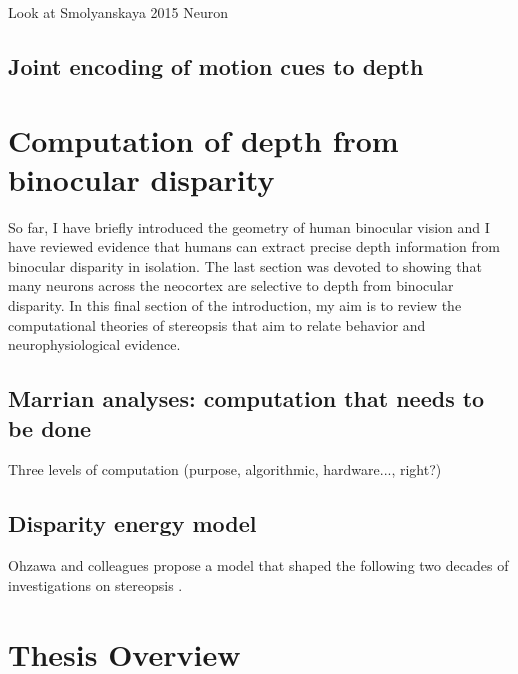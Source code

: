 \documentclass[oneside,12pt]{classes/CUEDthesisPSnPDF}
\begin{document}
Look at Smolyanskaya 2015 Neuron

\subsection{Joint encoding of motion cues to depth}

\section{Computation of depth from binocular disparity} %

So far, I have briefly introduced the geometry of human binocular vision and I have reviewed evidence that humans can extract precise depth information from binocular disparity in isolation. The last section was devoted to showing that many neurons across the neocortex are selective to depth from binocular disparity. In this final section of the introduction, my aim is to review the computational theories of stereopsis that aim to relate behavior and neurophysiological evidence.

\subsection{Marrian analyses: computation that needs to be done}
Three levels of computation (purpose, algorithmic, hardware..., right?)

\subsection{Disparity energy model}

Ohzawa and colleagues propose a model that shaped the following two decades of investigations on stereopsis \cite{Ohzawa:1990cq}. 

\section{Thesis Overview} 




\end{document}
